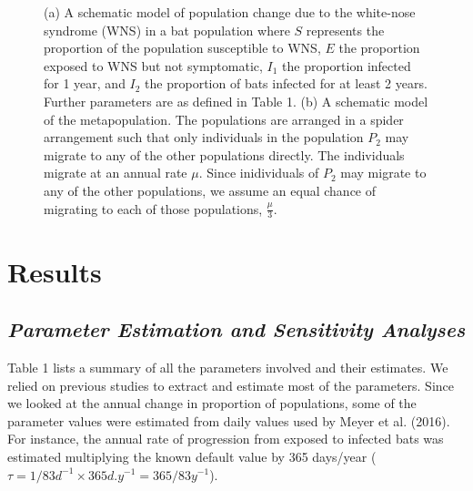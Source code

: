 \documentclass[12pt]{article}
\begin{document}
\begin{figure}
\begin{subfigure}{\textwidth}
\begin{tikzpicture}[node distance = 4cm]
    \end{tikzpicture}
    \caption{}
    \label{fig:my_label}
\end{subfigure}


\caption{(a) A schematic model of population change due to the white-nose syndrome (WNS) in a bat population where $S$ represents the proportion of the population susceptible to WNS, $E$ the proportion exposed to WNS but not symptomatic, $I_1$ the proportion infected for 1 year, and $I_2$ the proportion of bats infected for at least 2 years. Further parameters are as defined in Table 1. (b) A schematic model of the metapopulation. The populations are arranged in a spider arrangement such that only individuals in the population $P_2$ may migrate to any of the other populations directly. The individuals migrate at an annual rate $\mu$. Since inidividuals of $P_2$ may migrate to any of the other populations, we assume an equal chance of migrating to each of those populations, $\frac{\mu}{3}$.}
 
\end{figure}
    
    
    

\section*{\centering \sc \large Results}
 
 \subsection*{\sc\textit{Parameter Estimation and Sensitivity Analyses}}
 
 Table 1 lists a  summary of all the parameters involved and their estimates. We relied on previous studies to extract and estimate most of the parameters. Since we looked at the annual change in proportion of populations, some of the parameter values were estimated from daily values used by Meyer et al. (2016). For instance, the annual rate of progression from exposed to infected bats was estimated multiplying the known default value by 365 days/year ($\tau = 1/83 d^{-1} \times 365 d. y^{-1} = 365/83 y^{-1}$). 
 
\end{document}
